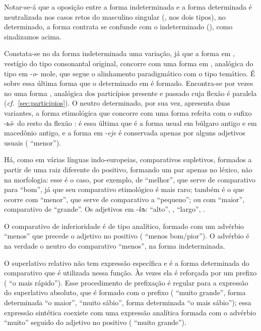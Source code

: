 Notar-se-á que a oposição entre a forma indeterminada e a forma
determinada é neutralizada nos casos retos do masculino singular
(,  nos dois tipos), no 
determinado, a forma contrata  se confunde com o
 indeterminado (), como
sinalizamos acima.

Constata-se no  da forma indeterminada uma variação, já que
a forma em , vestígio do tipo consonantal original,
concorre com uma forma em , analógica do tipo em
-\emph{o}- mole, que segue o alinhamento paradigmático com o tipo
temático. É sobre essa última forma que o  determinado em
 é formado. Encontra-se por vezes no  uma
forma , analógica dos particípios presente e passado
cuja flexão é paralela (\emph{cf.}~\ref{sec:participios}). O  neutro determinado,
por sua vez, apresenta duas variantes, a forma etimológica
 que concorre com uma forma refeita com o sufixo
-\emph{ьš}- do resto da flexão : é essa
última que é a forma usual em búlgaro antigo e em macedônio antigo, e a
forma em -\emph{eje} é conservada apenas por alguns adjetivos usuais
( ``menor'').

Há, como em várias línguas indo-europeias, comparativos supletivos,
formados a partir de uma raiz diferente do positivo, formando um par
apenas no léxico, não na morfologia: esse é o caso, por exemplo, de
 ``melhor'', que serve de comparativo para 
``bom'', já que seu comparativo etimológico  é mais raro;
também é o que ocorre com  ``menor'', que serve de
comparativo a  ``pequeno''; ou com 
``maior'', comparativo de  ``grande''.
Os adjetivos em -\emph{kъ}:  ``alto'', 
,  ``largo'', 
.

O comparativo de inferioridade é de tipo analítico, formado com um
advérbio  ``menos'' que precede o adjetivo no positivo
( ``menos bom/pior''). O advérbio  é na
verdade o neutro do comparativo  ``menos'', na
forma indeterminada.

O superlativo relativo não tem expressão específica e é a forma
determinada do comparativo que é utilizada nessa função. Às vezes ela é
reforçada por um prefixo  (
``o mais rápido'').
Esse procedimento de prefixação é regular para a
expressão do superlativo absoluto, que é formado com o prefixo
 ( ``muito grande'', forma determinada
 ``o maior'',  ``muito
sábio'', forma determinada  ``o mais sábio'');
essa expressão sintética coexiste com uma expressão analítica formada
com o advérbio  ``muito'' seguido do adjetivo no
positivo ( ``muito grande'').
\clearpage

